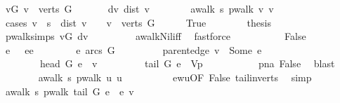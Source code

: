 \begin{isabellebody}
\ vG{\isacharcolon}\ {\isachardoublequoteopen}v\ {\isasymin}\ verts\ G{\isachardoublequoteclose}\ \isanewline
\ \ \ \ \isamarkupfalse%
\ dv{\isacharcolon}\ {\isachardoublequoteopen}dist\ v\ {\isasymnoteq}\ {\isasyminfinity}{\isachardoublequoteclose}\isanewline
\ \ \ \ \isamarkupfalse%
\ {\isachardoublequoteopen}awalk\ s\ {\isacharparenleft}pwalk\ v{\isacharparenright}\ v\ {\isachardoublequoteclose}\isanewline
\ \ \ \ \isamarkupfalse%
\ {\isacharparenleft}cases\ {\isachardoublequoteopen}v\ {\isacharequal}\ s\ {\isasymor}\ dist\ v\ {\isacharequal}\ {\isasyminfinity}\ {\isasymor}\ v\ {\isasymnotin}\ verts\ G{\isachardoublequoteclose}{\isacharparenright}\isanewline
\ \ \ \ \isamarkupfalse%
\ True\isanewline
\ \ \ \ \ \ \isamarkupfalse%
\ {\isacharquery}thesis\ \isanewline
\ \ \ \ \ \ \ \ \isamarkupfalse%
\ pwalk{\isachardot}simps\ vG\ dv\ \isanewline
\ \ \ \ \ \ \ \ awalk{\isacharunderscore}Nil{\isacharunderscore}iff\ \isamarkupfalse%
\ fastforce\isanewline
\ \ \ \ \isamarkupfalse%
\isanewline
\ \ \ \ \isamarkupfalse%
\ False\isanewline
\ \ \ \ \ \ \isamarkupfalse%
\ e\ \ \ ee{\isacharcolon}\isanewline
\ \ \ \ \ \ \ \ {\isachardoublequoteopen}e\ {\isasymin}arcs\ G{\isachardoublequoteclose}\ \isanewline
\ \ \ \ \ \ \ \ {\isachardoublequoteopen}parent{\isacharunderscore}edge\ v\ {\isacharequal}\ Some\ e{\isachardoublequoteclose}\ \isanewline
\ \ \ \ \ \ \ \ {\isachardoublequoteopen}head\ G\ e\ {\isacharequal}\ v{\isachardoublequoteclose}\ \isanewline
\ \ \ \ \ \ \ \ {\isachardoublequoteopen}{\isacharparenleft}tail\ G\ e{\isacharparenright}\ {\isasymnotin}\ V\isactrlsub p{\isachardoublequoteclose}\ \isanewline
\ \ \ \ \ \ \ \ \isamarkupfalse%
\ pna\ False\ \isamarkupfalse%
\ blast\isanewline
\ \ \ \ \ \ \isamarkupfalse%
\ {\isachardoublequoteopen}awalk\ s\ {\isacharparenleft}pwalk\ {\isacharquery}u{\isacharparenright}\ {\isacharquery}u{\isachardoublequoteclose}\isanewline
\ \ \ \ \ \ \ \ \isamarkupfalse%
\ ewu{\isacharbrackleft}OF\ False{\isacharbrackright}\ tail{\isacharunderscore}in{\isacharunderscore}verts\ \isamarkupfalse%
\ simp\isanewline
\ \ \ \ \ \ \isamarkupfalse%
\ {\isachardoublequoteopen}awalk\ s\ {\isacharparenleft}pwalk\ {\isacharparenleft}tail\ G\ e{\isacharparenright}\ {\isacharat}\ {\isacharbrackleft}e{\isacharbrackright}{\isacharparenright}\ v{\isachardoublequoteclose}\isanewline

\end{isabellebody}
